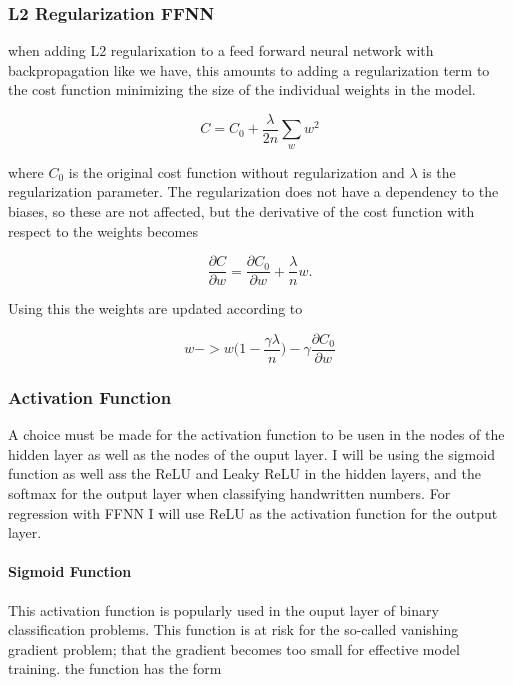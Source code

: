 \documentclass[11pt]{article}
\begin{document}
\hypertarget{l2-regularization-ffnn}{%
\subsubsection{L2 Regularization FFNN}\label{l2-regularization-ffnn}}

when adding L2 regularixation to a feed forward neural network with
backpropagation like we have, this amounts to adding a regularization
term to the cost function minimizing the size of the individual weights
in the model.

\[
C = C_0 + \frac{\lambda}{2n}\sum_w w^2
\]

where \(C_0\) is the original cost function without regularization and
\(\lambda\) is the regularization parameter. The regularization does not
have a dependency to the biases, so these are not affected, but the
derivative of the cost function with respect to the weights becomes

\[
\frac{\partial C}{\partial w} = \frac{\partial C_0}{\partial w} + \frac{\lambda}{n}w.
\]

Using this the weights are updated according to

\[
w -> w\bigg(1-\frac{\gamma\lambda}{n}\bigg)-\gamma\frac{\partial C_0}{\partial w}
\]

    \hypertarget{activation-function}{%
\subsubsection{Activation Function}\label{activation-function}}

A choice must be made for the activation function to be usen in the
nodes of the hidden layer as well as the nodes of the ouput layer. I
will be using the sigmoid function as well ass the ReLU and Leaky ReLU
in the hidden layers, and the softmax for the output layer when
classifying handwritten numbers. For regression with FFNN I will use
ReLU as the activation function for the output layer.

\hypertarget{sigmoid-function}{%
\paragraph{Sigmoid Function}\label{sigmoid-function}}

This activation function is popularly used in the ouput layer of binary
classification problems. This function is at risk for the so-called
vanishing gradient problem; that the gradient becomes too small for
effective model training. the function has the form
\end{document}
